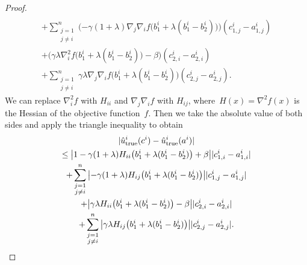 \documentclass[9pt,shortpaper,twoside,web]{ieeecolor}
\newcommand{\tr}{\textnormal{true}}
\begin{document}
\begin{proof}
\begin{multline}
        \\+\sum_{\substack{j=1\\j\not=i}}^n\Big({-\gamma}(1+\lambda) \nabla_j\nabla_i f \big(b^i_1 + \lambda(b^i_1-b^i_2)\big)\Big)(c^i_{1,j}-a^i_{1,j})
        \\ + \Big(\gamma\lambda\nabla^2_if\big(b^i_1+\lambda(b^i_1-b^i_2)\big)-\beta\Big)(c^i_{2,i}-a^i_{2,i})
        \\ + \sum_{\substack{j=1\\j\not=i}}^n\gamma\lambda \nabla_j\nabla_if\big(b^i_1+\lambda(b^i_1-b^i_2)\big)(c^i_{2,j}-a^i_{2,j}).
    \end{multline}
    We can replace $\nabla_i^2f$ with $H_{ii}$ and $\nabla_j\nabla_if$ with $H_{ij}$, 
    where~$H(x)=\nabla^2f(x)$ is the Hessian of the objective function~$f$. 
    Then we take the absolute value of both sides and apply the triangle inequality to obtain
    \begin{multline}\label{eq:sssproof2_lem}
        \vert \hat u^i_\tr(c^i)-\hat u^i_\tr(a^i)\vert
        \\ \leq \big\vert 1-\gamma(1+\lambda)H_{ii}\big(b^i_1+\lambda(b^i_1-b^i_2)\big)+\beta\big\vert\vert c^i_{1,i}-a^i_{1,i}\vert
        \\ +\sum_{\substack{j=1\\j\not=i}}^n\big\vert {-\gamma}(1+\lambda)H_{ij}\big(b^i_1+\lambda(b^i_1-b^i_2)\big)\big\vert\vert c^i_{1,j}-a^i_{1,j}\vert
        \\+\big\vert \gamma\lambda H_{ii}\big(b^i_1+\lambda(b^i_1-b^i_2)\big)-\beta \big\vert\vert c^i_{2,i}-a^i_{2,i}\vert
        \\ +\sum_{\substack{j=1\\j\not=i}}^n\big\vert \gamma\lambda H_{ij} \big(b^i_1+\lambda(b^i_1-b^i_2)\big)\big\vert\vert c^i_{2,j}-a^i_{2,j}\vert.
    \end{multline}
    

\end{proof}
\end{document}

